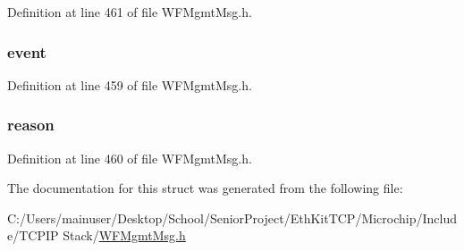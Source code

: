 Definition at line 461 of file W\+F\+Mgmt\+Msg.\+h.

\hypertarget{structmgmt_indicate_soft_a_p_event_a1cf9104de23558de5618e652cf66a489}{}
\subsubsection[{event}]{ event}\label{structmgmt_indicate_soft_a_p_event_a1cf9104de23558de5618e652cf66a489}


Definition at line 459 of file W\+F\+Mgmt\+Msg.\+h.

\hypertarget{structmgmt_indicate_soft_a_p_event_a8a1f56973f869a1f505953998d9f77af}{}
\subsubsection[{reason}]{ reason}\label{structmgmt_indicate_soft_a_p_event_a8a1f56973f869a1f505953998d9f77af}


Definition at line 460 of file W\+F\+Mgmt\+Msg.\+h.



The documentation for this struct was generated from the following file\+:\begin{DoxyCompactItemize}
\item 
C\+:/\+Users/mainuser/\+Desktop/\+School/\+Senior\+Project/\+Eth\+Kit\+T\+C\+P/\+Microchip/\+Include/\+T\+C\+P\+I\+P Stack/\hyperlink{_w_f_mgmt_msg_8h}{W\+F\+Mgmt\+Msg.\+h}\end{DoxyCompactItemize}
